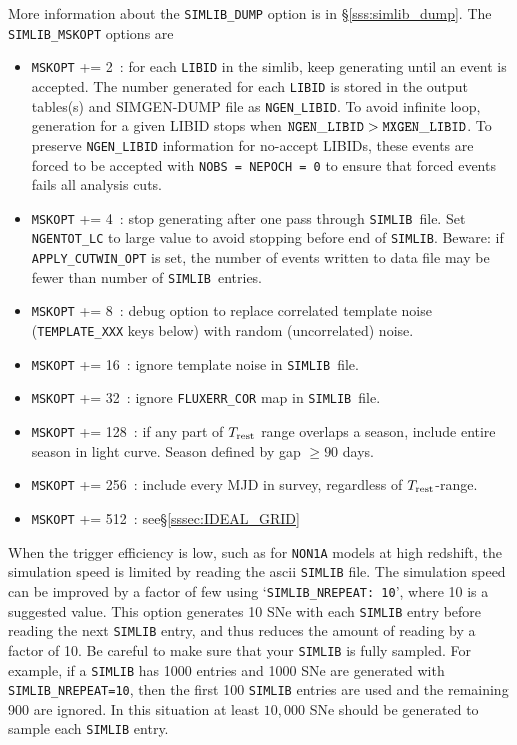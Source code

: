 \documentclass[12pt]{article}
\newcommand{\Trest}{T_{\rm rest}}
\newcommand{\simlib}{{\tt SIMLIB}}
\begin{document}
{More information about the {\tt SIMLIB\_DUMP} option
is in \S\ref{sss:simlib_dump}.
The {\tt SIMLIB\_MSKOPT} options are 
\begin{itemize}
   \item {\tt MSKOPT} += 2~: for each {\tt LIBID} in the simlib,
      keep generating until an event is accepted. 
      The number generated for each {\tt LIBID} is stored in
      the output tables(s) and SIMGEN-DUMP file as {\tt NGEN\_LIBID}.
      To avoid infinite loop, generation for a given LIBID stops 
      when  ${\tt NGEN\_LIBID} > {\tt MXGEN\_LIBID}$. 
      To preserve {\tt NGEN\_LIBID} information for no-accept LIBIDs,
      these events are forced to be accepted with 
      {\tt NOBS = NEPOCH = 0} 
      to ensure that forced events fails all analysis cuts.
%
   \item {\tt MSKOPT} += 4~: 
        stop generating after one pass through \simlib\ file.
        Set {\tt NGENTOT\_LC} to large value to avoid stopping
        before end of \simlib. Beware: if {\tt APPLY\_CUTWIN\_OPT} is set,
        the number of events written to data file may be fewer
        than number of \simlib\ entries.
%
   \item {\tt MSKOPT} += 8~: debug option to replace correlated
      template noise ({\tt TEMPLATE\_XXX} keys below) with
      random (uncorrelated) noise.
%
   \item {\tt MSKOPT} += 16~: ignore template noise in \simlib\ file.
%
   \item {\tt MSKOPT} += 32~: ignore {\tt FLUXERR\_COR} map in \simlib\ file.
%
   \item {\tt MSKOPT} += 128~: if any part of $\Trest$ range overlaps
      a season, include entire season in light curve. Season defined
      by gap $\ge 90$ days.
%
   \item {\tt MSKOPT} += 256~: include every MJD in survey, 
      regardless of $\Trest$-range.
%
   \item {\tt MSKOPT} += 512~:  see\S\ref{sssec:IDEAL_GRID}
\end{itemize}

\medskip
When the trigger efficiency is low, such as for {\tt NON1A} models
at high redshift, the simulation speed is limited by reading the
ascii {\tt SIMLIB} file. The simulation speed can be improved by
a factor of few using  `{\tt SIMLIB\_NREPEAT: 10}', where 10
is a suggested value.
This option generates 10 SNe with each {\tt SIMLIB} entry before
reading the next {\tt SIMLIB} entry, and thus reduces the amount
of reading by a factor of 10. Be careful to make sure that your
{\tt SIMLIB} is fully sampled. For example, if a {\tt SIMLIB} has
1000 entries and 1000 SNe are generated with {\tt SIMLIB\_NREPEAT=10},
then the first 100 {\tt SIMLIB} entries are  used
and the remaining 900 are ignored. In this situation at least
$10,000$ SNe should be generated to sample each {\tt SIMLIB} entry.

}
\end{document}
